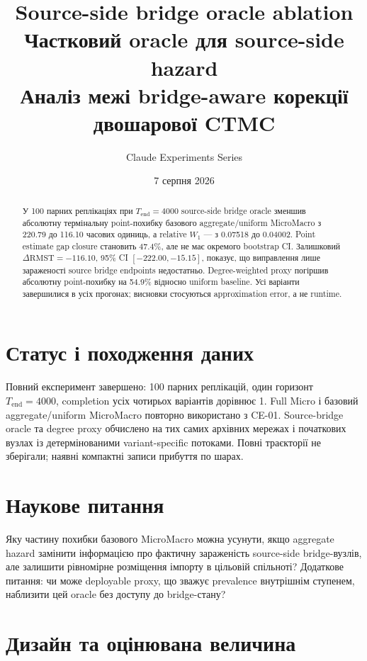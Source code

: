 \documentclass[11pt,a4paper]{article}
\title{\textbf{Source-side bridge oracle ablation}\\[0.4em]
\large Частковий oracle для source-side hazard\\[0.2em]
\large Аналіз межі bridge-aware корекції двошарової CTMC}
\author{Claude Experiments Series}
\date{7 серпня 2026}
\begin{document}
\sloppy
\maketitle

\begin{abstract}
У 100 парних реплікаціях при $T_{\mathrm{end}}=4000$ source-side bridge oracle
зменшив абсолютну термінальну point-похибку базового aggregate/uniform
MicroMacro з 220.79 до 116.10 часових одиниць, а relative $W_1$ --- з 0.07518
до 0.04002. Point estimate gap closure становить 47.4\%, але не має окремого
bootstrap CI. Залишковий $\Delta\mathrm{RMST}=-116.10$,
95\% CI $[-222.00,-15.15]$, показує, що виправлення лише зараженості
source bridge endpoints недостатньо. Degree-weighted proxy погіршив абсолютну
point-похибку на 54.9\% відносно uniform baseline. Усі варіанти завершилися
в усіх прогонах; висновки стосуються approximation error, а не runtime.
\end{abstract}

\tableofcontents
\clearpage

\section{Статус і походження даних}\label{sec:status}

Повний експеримент завершено: 100 парних реплікацій, один горизонт
$T_{\mathrm{end}}=4000$, completion усіх чотирьох варіантів дорівнює 1.
Full Micro і базовий aggregate/uniform MicroMacro повторно використано з CE-01.
Source-bridge oracle та degree proxy обчислено на тих самих архівних мережах і
початкових вузлах із детермінованими variant-specific потоками. Повні траєкторії
не зберігали; наявні компактні записи прибуття по шарах.

\section{Наукове питання}\label{sec:question}

Яку частину похибки базового MicroMacro можна усунути, якщо aggregate hazard
замінити інформацією про фактичну зараженість source-side bridge-вузлів, але
залишити рівномірне розміщення імпорту в цільовій спільноті? Додаткове питання:
чи може deployable proxy, що зважує prevalence внутрішнім ступенем, наблизити
цей oracle без доступу до bridge-стану?

\section{Дизайн та оцінювана величина}\label{sec:design}
\end{document}
